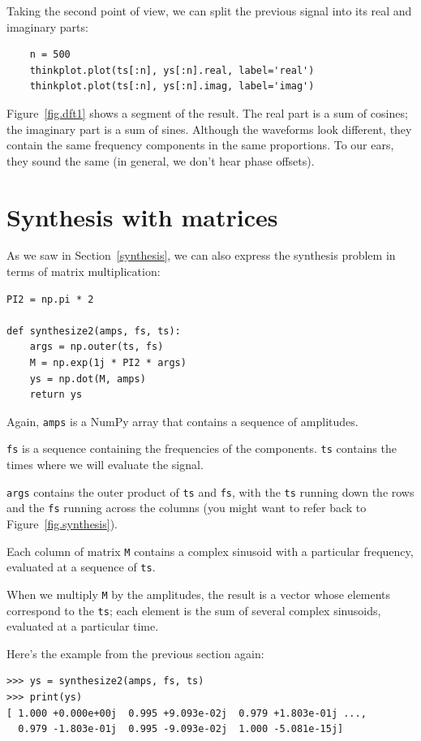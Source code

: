 \documentclass[12pt]{book}
\begin{document}
Taking the second point of view, we can split the previous
signal into its real and imaginary parts:

\begin{verbatim}
    n = 500
    thinkplot.plot(ts[:n], ys[:n].real, label='real')
    thinkplot.plot(ts[:n], ys[:n].imag, label='imag')
\end{verbatim}

Figure~\ref{fig.dft1} shows a segment of the result.  The
real part is a sum of cosines; the imaginary part is
a sum of sines.  Although the waveforms look different, they
contain the same frequency components in the same proportions.
To our ears, they sound the same (in general, we don't hear
phase offsets).


\section{Synthesis with matrices}
\label{synthmat}

As we saw in Section~\ref{synthesis}, we can also express the synthesis
problem in terms of matrix multiplication: 

\begin{verbatim}
PI2 = np.pi * 2

def synthesize2(amps, fs, ts):
    args = np.outer(ts, fs)
    M = np.exp(1j * PI2 * args)
    ys = np.dot(M, amps)
    return ys
\end{verbatim}

Again, {\tt amps} is a NumPy array that contains a sequence of
amplitudes.

{\tt fs} is a sequence containing the frequencies of the
components.  {\tt ts} contains the times where we will evaluate
the signal.

{\tt args} contains the outer product of {\tt ts} and {\tt fs},
with the {\tt ts} running down the rows and the {\tt fs} running
across the columns (you might want to refer back to
Figure~\ref{fig.synthesis}).

Each column of matrix {\tt M} contains a complex sinusoid with
a particular frequency, evaluated at a sequence of {\tt ts}.

When we multiply {\tt M} by the amplitudes, the result is a vector
whose elements correspond to the {\tt ts}; each element is the sum of
several complex sinusoids, evaluated at a particular time.

Here's the example from the previous section again:

\begin{verbatim}
>>> ys = synthesize2(amps, fs, ts)
>>> print(ys)
[ 1.000 +0.000e+00j  0.995 +9.093e-02j  0.979 +1.803e-01j ...,
  0.979 -1.803e-01j  0.995 -9.093e-02j  1.000 -5.081e-15j]
\end{verbatim}
\end{document}
